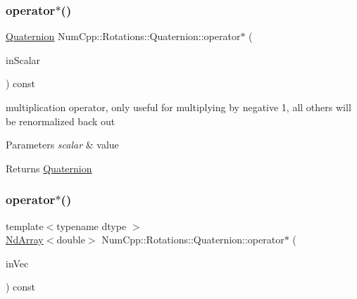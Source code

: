 \subsubsection{\texorpdfstring{operator$\ast$()}{operator*()}\hspace{0.1cm}{\footnotesize\ttfamily [2/3]}}
{\footnotesize\ttfamily \mbox{\hyperlink{class_num_cpp_1_1_rotations_1_1_quaternion}{Quaternion}} Num\+Cpp\+::\+Rotations\+::\+Quaternion\+::operator$\ast$ (\begin{DoxyParamCaption}\item[{double}]{in\+Scalar }\end{DoxyParamCaption}) const\hspace{0.3cm}{\ttfamily [inline]}}

multiplication operator, only useful for multiplying by negative 1, all others will be renormalized back out


\begin{DoxyParams}{Parameters}
{\em scalar} & value \\
\hline
\end{DoxyParams}
\begin{DoxyReturn}{Returns}
\mbox{\hyperlink{class_num_cpp_1_1_rotations_1_1_quaternion}{Quaternion}} 
\end{DoxyReturn}
\mbox{\label{class_num_cpp_1_1_rotations_1_1_quaternion_a706c101d2cb79ea8d48cfe8de3dc5445}} 
\subsubsection{\texorpdfstring{operator$\ast$()}{operator*()}\hspace{0.1cm}{\footnotesize\ttfamily [3/3]}}
{\footnotesize\ttfamily template$<$typename dtype $>$ \\
\mbox{\hyperlink{class_num_cpp_1_1_nd_array}{Nd\+Array}}$<$double$>$ Num\+Cpp\+::\+Rotations\+::\+Quaternion\+::operator$\ast$ (\begin{DoxyParamCaption}\item[{const \mbox{\hyperlink{class_num_cpp_1_1_nd_array}{Nd\+Array}}$<$ dtype $>$ \&}]{in\+Vec }\end{DoxyParamCaption}) const\hspace{0.3cm}{\ttfamily [inline]}}

